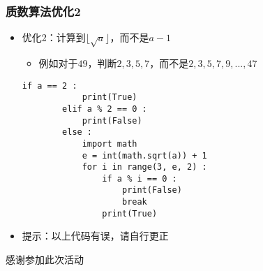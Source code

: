 \begin{CJK}{UTF8}{gbsn}
\begin{frame} [fragile]
	\frametitle{质数算法优化2}
	\begin{itemize}
	\item 优化2：计算到$\lfloor\sqrt{a}\rfloor$，而不是$a - 1$
		\begin{itemize}
		\item 例如对于$49$，判断$2, 3, 5, 7$，而不是$2, 3, 5, 7, 9, ..., 47$
		\end{itemize}
		\begin{lstlisting}[style=pythonstyle, gobble=8]
		if a == 2 :
			print(True)
		elif a % 2 == 0 :
			print(False)
		else :
			import math
			e = int(math.sqrt(a)) + 1
			for i in range(3, e, 2) :
				if a % i == 0 :
					print(False)
					break
				print(True)
		\end{lstlisting}
	\item 提示：以上代码有误，请自行更正
	\end{itemize}
\end{frame}

\PreLastFrame
\begin{frame}
	\centerline{\fontsize{32}{32}\selectfont 感谢参加此次活动}
\end{frame}

\newpage
\end{CJK}


